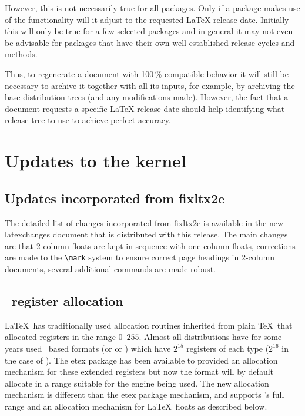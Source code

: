 \documentclass{ltnews}
\begin{document}
However, this is not necessarily true for all packages.
 Only if a package makes use of the 
functionality will it adjust to the
requested \LaTeX{} release date. Initially this will only be true for
a few selected packages and in general it may not even be advisable for packages
that have their own well-established release cycles and methods.

Thus, to regenerate a document with 100\,\% compatible behavior
it will still be necessary
to archive it together with all its inputs, for example, by archiving
the base distribution trees (and any modifications made). However, the
fact that a document requests a specific \LaTeX{} release date should
help identifying what release tree to use to achieve perfect accuracy.


\section{Updates to the kernel}

\subsection{Updates incorporated from \textsf{fixltx2e}}

The detailed list of changes incorporated from \textsf{fixltx2e} is
available in the new \textsf{latexchanges} document that is
distributed with this release. The main changes are that $2$-column
floats are kept in sequence with one column floats, corrections are
made to the \verb|\mark| system to ensure correct page headings in
$2$-column documents, several additional commands are made robust.

\subsection{\eTeX\ register allocation}

\LaTeX\ has traditionally used allocation routines inherited from plain \TeX\
that allocated registers in the range $0$--$255$. Almost all distributions have
for some years used \eTeX\ based formats (or \hologo{XeTeX} or )
which have $2^{15}$ registers of each type ($2^{16}$ in the case of
\hologo{LuaTeX}). The \textsf{etex} package has been available to provided an
allocation mechanism for these extended registers but now the format will by
default allocate in a range suitable for the engine being used. The new
allocation mechanism is different than the \textsf{etex} package mechanism, and
supports \hologo{LuaTeX}'s full range and an allocation mechanism for \LaTeX\
floats as described below.
\end{document}
